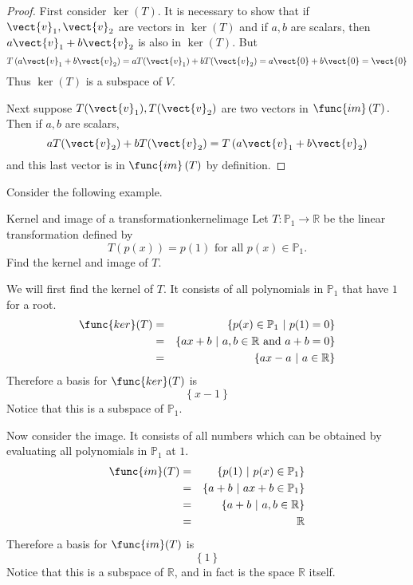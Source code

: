 \begin{proof}
First consider $\ker \left( T\right) .$ It is necessary to
show that if $\vect{v}_{1},\vect{v}_{2}$ are vectors in $\ker \left( T\right) $
and if $a,b$ are scalars, then $a\vect{v}_{1}+b\vect{v}_{2}$ is also in $\ker
\left( T\right) .$ But 
\begin{equation*}
T\left( a\vect{v}_{1}+b\vect{v}_{2}\right) =aT(\vect{v}_{1})+bT(\vect{v}_{2})=a\vect{0}+b\vect{0}=\vect{0}
\end{equation*}
Thus $\ker \left( T\right) $ is a subspace of $V$.

Next suppose $T(\vect{v}_{1}),T(\vect{v}_{2})$ are two vectors in $\func{im}\left(
T\right) .$ Then if $a,b$ are scalars, 
\begin{equation*}
aT(\vect{v}_{2})+bT(\vect{v}_{2})=T\left( a\vect{v}_{1}+b\vect{v}_{2}\right)
\end{equation*}
and this last vector is in $\func{im}\left( T\right) $ by definition. 
\end{proof}

Consider the following example.

\begin{example}{Kernel and image of a transformation}{kernelimage}
Let $T:\mathbb{P}_1\to\mathbb{R}$ be the linear transformation defined by
\[ T(p(x))=p(1)\mbox{ for all } p(x)\in \mathbb{P}_1.\]
Find the kernel and image of $T$.
\end{example}

\begin{solution}
We will first find the kernel of $T$. It consists of all polynomials in $\mathbb{P}_1$ that have $1$ for a root. 
\begin{eqnarray*}
\func{ker}(T) & = & \{ p(x)\in \mathbb{P}_1 ~|~ p(1)=0\} \\
& = & \{ ax+b ~|~ a,b\in\mathbb{R} \mbox{ and }a+b=0\} \\
& = & \{ ax-a ~|~ a\in\mathbb{R} \}
\end{eqnarray*}
Therefore a basis for $\func{ker}(T)$ is 
\[
\left\{ x-1 \right\}
\]
Notice that this is a subspace of $\mathbb{P}_1$. 

Now consider the image. It consists of all numbers which can be obtained by evaluating all polynomials in $\mathbb{P}_1$ at $1$. 
\begin{eqnarray*}
\func{im}(T) & = & \{ p(1) ~|~ p(x)\in \mathbb{P}_1 \} \\
 & = & \{ a+b ~|~ ax+b\in \mathbb{P}_1 \} \\
 & = & \{ a+b ~|~ a,b\in\mathbb{R} \}\\
 & = & \mathbb{R}
\end{eqnarray*}
Therefore a basis for $\func{im}(T)$ is 
\[
\left\{ 1 \right\}
\]
Notice that this is a subspace of $\mathbb{R}$, and in fact is the space $\mathbb{R}$ itself. 
\end{solution}

